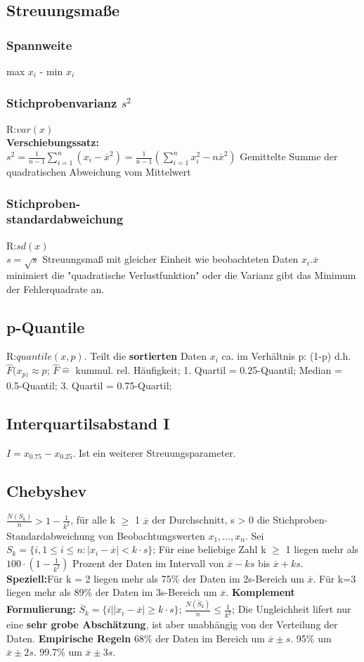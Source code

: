   \subsection{Streuungsmaße}
    \subsubsection{Spannweite}
    max $x_{i}$ - min $x_{i}$
    \subsubsection{Stichprobenvarianz $s^2$}
    R:$var(x)$\\
    \textbf{Verschiebungssatz:}\\
      $s^2 = \frac{1}{n-1} \sum_{i=1}^{n}(x_{i} - \overline{x}^2) = \frac{1}{n-1} (\sum_{i=1}^{n} x_{i}^2 - n\overline{x}^2)$
      Gemittelte Summe der quadratischen Abweichung vom Mittelwert
      \subsubsection{Stichproben-\\standardabweichung}
      R:$sd(x)$\\
      $s=\sqrt{s}$
      Streuungsmaß mit gleicher Einheit wie beobachteten Daten $x_{i}$.$ \overline{x}$ minimiert die "quadratische Verlustfunktion" oder die Varianz gibt das Minimum der Fehlerquadrate an.
      \subsection{p-Quantile}
      R:$quantile(x,p)$. Teilt die \textbf{sortierten} Daten $x_{i}$ ca. im Verhältnis p: (1-p) d.h. $\hat{F}(x_{p)} \approx p$; 
      $\hat{F} \hat{=} $ kummul. rel. Häufigkeit; 
      1. Quartil = 0.25-Quantil; 
      Median = 0.5-Quantil; 
      3. Quartil = 0.75-Quartil; 
      \subsection{Interquartilsabstand I}
      $I = x_{0.75} - x_{0.25}$. Ist ein weiterer Streuungsparameter.
      \subsection{Chebyshev}
      $\frac{N(S_{k})}{n} > 1-\frac{1}{k^2}$, für alle k $\geq$ 1
      $\overline{x}$ der Durchschnitt, s > 0 die Stichproben-Standardabweichung von Beobachtungswerten $x_{1}, ..., x_{n}$. Sei $S_{k} = \{i, 1 \leq i \leq n: |x_{i} - \overline{x}| < k \cdot s\}$; Für eine beliebige Zahl k $\geq$ 1 liegen mehr als $100 \cdot (1-\frac{1}{k^2})$ Prozent der Daten im Intervall von $\overline{x} - ks$ bis $ \overline{x} + ks$. \textbf{Speziell:}Für k = 2 liegen mehr als 75\% der Daten im 2s-Bereich um $\overline{x}$. Für k=3 liegen mehr als 89\% der Daten im 3s-Bereich um $\overline{x}$. \textbf{Komplement Formulierung:} $\overline{S}_{k} = \{i | |x_{i}-\overline{x}| \geq k \cdot s\}$; 
      $\frac{N(\overline{S}_{k})}{n} \leq \frac{1}{k^2}$; Die Ungleichheit lifert nur eine \textbf{sehr grobe Abschätzung}, ist aber unabhängig von der Verteilung der Daten. \textbf{Empirische Regeln} 68\% der Daten im Bereich um $\overline{x} \pm s$. 95\% um $\overline{x} \pm 2s$. 99.7\% um $\overline{x} \pm3s$.
